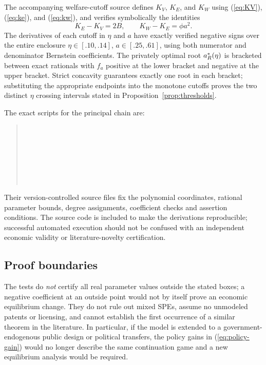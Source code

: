 The accompanying welfare-cutoff source defines \(K_V\), \(K_E\), and \(K_W\) using (\ref{eq:KV}), (\ref{eq:ke}), and (\ref{eq:kw}), and verifies symbolically the identities
\[
 K_E-K_V=2B,\qquad K_W-K_E=\phi a^2.
\]
The derivatives of each cutoff in \(\eta\) and \(a\) have exactly verified negative signs over the entire enclosure \(\eta\in[.10,.14]\), \(a\in[.25,.61]\), using both numerator and denominator Bernstein coefficients. The privately optimal root \(a_R^*(\eta)\) is bracketed between exact rationals with \(f_a\) positive at the lower bracket and negative at the upper bracket. Strict concavity guarantees exactly one root in each bracket; substituting the appropriate endpoints into the monotone cutoffs proves the two distinct \(\eta\) crossing intervals stated in Proposition~\ref{prop:thresholds}.

The exact scripts for the principal chain are:
\begin{quote}\small
\noindent{}\\
\\
\\
\\
\\
\\
\end{quote}
Their version-controlled source files fix the polynomial coordinates, rational parameter bounds, degree assignments, coefficient checks and assertion conditions. The source code is included to make the derivations reproducible; successful automated execution should not be confused with an independent economic validity or literature-novelty certification.

\subsection{Proof boundaries}

The tests do \emph{not} certify all real parameter values outside the stated boxes; a negative coefficient at an outside point would not by itself prove an economic equilibrium change. They do not rule out mixed SPEs, assume no unmodeled patents or licensing, and cannot establish the first occurrence of a similar theorem in the literature. In particular, if the model is extended to a government-endogenous public design or political transfers, the policy gains in (\ref{eq:policy-gain}) would no longer describe the same continuation game and a new equilibrium analysis would be required.
